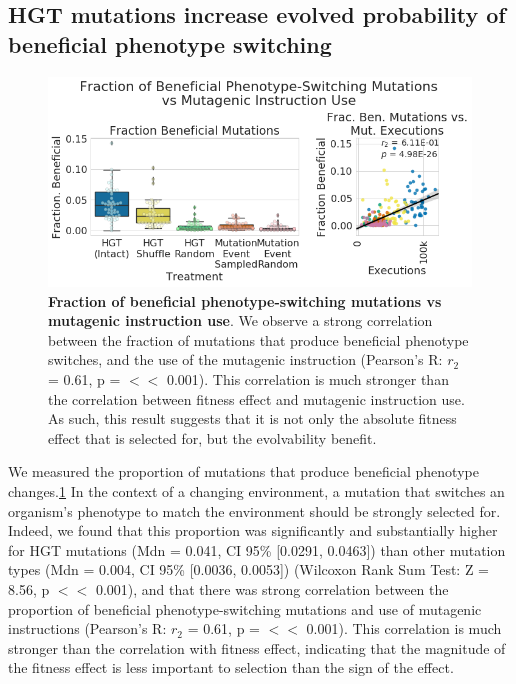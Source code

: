 \documentclass[PhD]{msu-thesis}
\begin{document}

\subsection{HGT mutations increase evolved probability of beneficial phenotype switching}
	\begin{figure}[h!]
	\begin{center}
	\includegraphics[width=0.95\columnwidth]{figures/HGT/mutagen_use_vs_fraction_beneficial.png}
	\caption{\textbf{Fraction of beneficial phenotype-switching mutations vs mutagenic instruction use}. We observe a strong correlation between the fraction of mutations that produce beneficial phenotype switches, and the use of the mutagenic instruction (Pearson's R: $r_{2}$ = 0.61, p =  $<<$ 0.001). This correlation is much stronger than the correlation between fitness effect and mutagenic instruction use. As such, this result suggests that it is not only the absolute fitness effect that is selected for, but the evolvability benefit.
	}\label{fig:mutagen_use_vs_fraction_beneficial}
	\end{center}
	\end{figure}

We measured the proportion of mutations that produce beneficial phenotype changes.\ref{fig:mutagen_use_vs_fraction_beneficial} In the context of a changing environment, a mutation that switches an organism's phenotype to match the environment should be strongly selected for. Indeed, we found that this proportion was significantly and substantially higher for HGT mutations (Mdn = 0.041, CI 95\% [0.0291, 0.0463]) than other mutation types (Mdn = 0.004, CI 95\% [0.0036, 0.0053]) (Wilcoxon Rank Sum Test: Z = 8.56, p $<<$ 0.001), and that there was strong correlation between the proportion of beneficial phenotype-switching mutations and use of mutagenic instructions (Pearson's R: $r_{2}$ = 0.61, p =  $<<$ 0.001). This correlation is much stronger than the correlation with fitness effect, indicating that the magnitude of the fitness effect is less important to selection than the sign of the effect.
\end{document}
